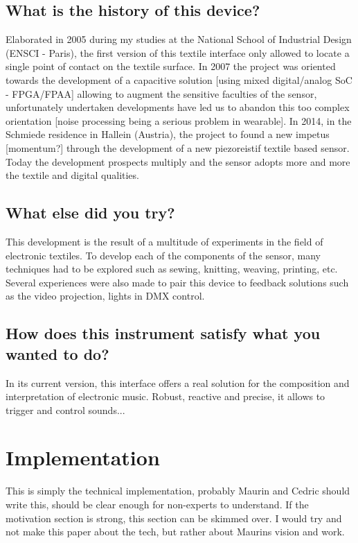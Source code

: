 \documentclass{sigchi-ext}
\begin{document}
\subsection{What is the history of this device?}
Elaborated in 2005 during my studies at the National School of Industrial Design (ENSCI - Paris), the first version of this textile interface only allowed to locate a single point of contact on the textile surface. In 2007 the project was oriented towards the development of a capacitive solution [using mixed digital/analog SoC - FPGA/FPAA] allowing to augment the sensitive faculties of the sensor, unfortunately undertaken developments have led us to abandon this too complex orientation [noise processing being a serious problem in wearable]. In 2014, in the Schmiede residence in Hallein (Austria), the project to found a new impetus [momentum?] through the development of a new piezoreistif textile based sensor. Today the development prospects multiply and the sensor adopts more and more the textile and digital qualities.


\subsection{What else did you try?}
This development is the result of a multitude of experiments in the field of electronic textiles. To develop each of the components of the sensor, many techniques had to be explored such as sewing, knitting, weaving, printing, etc. Several experiences were also made to pair this device to feedback solutions such as the video projection, lights in DMX control.


\subsection{How does this instrument satisfy what you wanted to do?}
In its current version, this interface offers a real solution for the composition and interpretation of electronic music. Robust, reactive and precise, it allows to trigger and control sounds...


\section{Implementation}

This is simply the technical implementation, probably Maurin and Cedric should write this, should be clear enough for non-experts to understand. If the motivation section is strong, this section can be skimmed over. I would try and not make this paper about the tech, but rather about Maurins vision and work.
\end{document}
